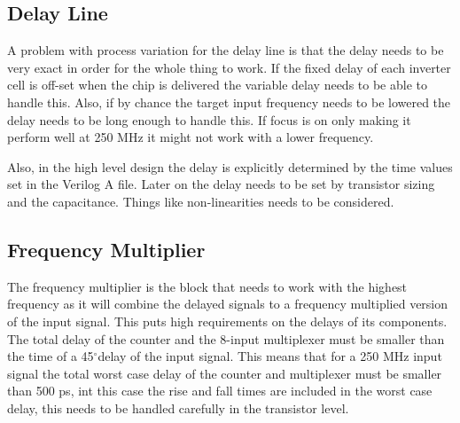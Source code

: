 \documentclass[a4paper,12pt]{article} \usepackage{graphicx}
\newcommand{\degree}{\ensuremath{^\circ}}
\begin{document}
\subsection{Delay Line}
A problem with process variation for the delay line is that the delay
needs to be very exact in order for the whole thing to work. If the
fixed delay of each inverter cell is off-set when the chip is
delivered the variable delay needs to be able to handle this. Also,
if by chance the target input frequency needs to be lowered the delay
needs to be long enough to handle this. If focus is on only making it
perform well at 250 MHz it might not work with a lower frequency. 

Also, in the high level design the delay is explicitly determined by
the time values set in the Verilog A file. Later on the delay needs to
be set by transistor sizing and the capacitance. Things like
non-linearities needs to be considered.

\subsection{Frequency Multiplier}
The frequency multiplier is the block that needs to work with the highest 
frequency as it will combine the delayed signals to a frequency multiplied 
version of the input signal. This puts high requirements on the delays of its
components. The total delay of the counter and the 8-input multiplexer
must be smaller than the time of a 45\degree  delay of the input signal.
This means that for a 250 MHz input signal the total worst case delay of the
counter and multiplexer must be smaller than 500 ps, int this case the rise
 and fall times are included in the worst case delay, this needs to be handled
carefully in the transistor level.
\end{document}
